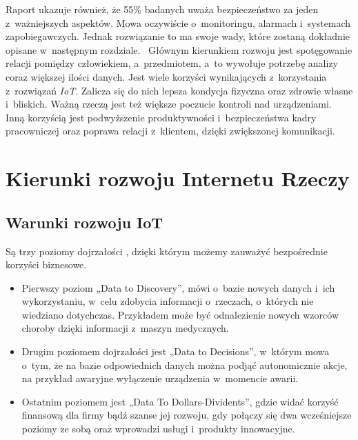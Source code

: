 \documentclass{xmgr}
\begin{document}
	Raport ukazuje również, że 55\% badanych uważa bezpieczeństwo za jeden z~ważniejszych aspektów. Mowa oczywiście o~monitoringu, alarmach i~systemach zapobiegawczych. Jednak rozwiązanie to ma swoje wady, które zostaną dokładnie opisane w~następnym rozdziale.~\cite{Gfk:2015:CMC}
	Głównym kierunkiem rozwoju jest spotęgowanie relacji pomiędzy człowiekiem, a~przedmiotem, a~to wywołuje potrzebę analizy coraz większej ilości danych. 
	Jest wiele korzyści wynikających z~korzystania z~rozwiązań \emph{IoT}. Zalicza się do nich lepsza kondycja fizyczna oraz zdrowie własne i~bliskich. Ważną rzeczą jest też większe poczucie kontroli nad urządzeniami. Inną korzyścią jest podwyższenie produktywności i~bezpieczeństwa kadry pracowniczej oraz poprawa relacji z~klientem, dzięki zwiększonej komunikacji.
\chapter{Kierunki rozwoju Internetu Rzeczy}

\section{Warunki rozwoju IoT}
	Są trzy poziomy dojrzałości \cite{RP:2015:IOTPL}, dzięki którym możemy zauważyć bezpośrednie korzyści biznesowe. 
\begin{itemize}
\item Pierwszy poziom „Data to Discovery”, mówi o~bazie nowych danych i~ich wykorzystaniu, w~celu  zdobycia informacji o~rzeczach, o~których nie wiedziano dotychczas. Przykładem może być odnalezienie nowych wzorców choroby dzięki informacji z~maszyn medycznych. 
\item Drugim poziomem dojrzałości jest „Data to Decisions”, w~którym mowa o~tym, że na bazie odpowiednich danych można podjąć autonomicznie akcje, na przykład awaryjne wyłączenie urządzenia w~momencie awarii. 
\item Ostatnim poziomem jest „Data To Dollars-Dividents”, gdzie widać korzyść finansową dla firmy bądź szanse jej rozwoju, gdy połączy się dwa wcześniejsze poziomy ze sobą oraz wprowadzi usługi i~produkty innowacyjne.
\end{itemize}
 
\end{document}
